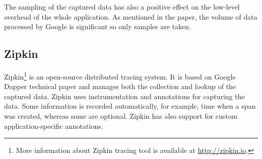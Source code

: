 The sampling of the captured data has also a positive effect on the low-level overhead of the whole application. As mentioned in the paper, the volume of data processed by Google is significant so only samples are taken.

\subsection{Zipkin}
\label{zipkin}
Zipkin\footnote{More information about Zipkin tracing tool is available at \url{http://zipkin.io}.} is an open-source distributed tracing system. It is based on Google Dapper technical paper and manages both the collection and lookup of the captured data. Zipkin uses instrumentation and annotations for capturing the data. Some
information is recorded automatically, for example, time when a span was created, whereas some are optional. Zipkin has also support for custom application-specific annotations.

